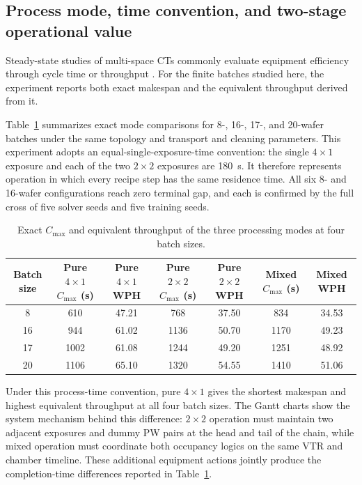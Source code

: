 \documentclass[final,5p,times,twocolumn]{elsarticle}
\begin{document}
\subsection{Process mode, time convention, and two-stage operational value}

Steady-state studies of multi-space CTs commonly evaluate equipment efficiency through cycle time or throughput \citep{gu2024multifinger}. For the finite batches studied here, the experiment reports both exact makespan and the equivalent throughput derived from it.

Table~\ref{tab:mode-extended-en} summarizes exact mode comparisons for 8-, 16-, 17-, and 20-wafer batches under the same topology and transport and cleaning parameters. This experiment adopts an equal-single-exposure-time convention: the single $4\times1$ exposure and each of the two $2\times2$ exposures are 180~s. It therefore represents operation in which every recipe step has the same residence time. All six 8- and 16-wafer configurations reach zero terminal gap, and each is confirmed by the full cross of five solver seeds and five training seeds.


\begin{table}[!htbp]
\centering
\small
\caption{Exact $C_{\max}$ and equivalent throughput of the three processing modes at four batch sizes.}
\label{tab:mode-extended-en}
\begin{tabular}{c c c c c c c}
\toprule
Batch size & Pure $4\times1$ $C_{\max}$ (s) & Pure $4\times1$ WPH & Pure $2\times2$ $C_{\max}$ (s) & Pure $2\times2$ WPH & Mixed $C_{\max}$ (s) & Mixed WPH\\
\midrule
8  & 610  & 47.21 & 768  & 37.50 & 834  & 34.53\\
16 & 944  & 61.02 & 1136 & 50.70 & 1170 & 49.23\\
17 & 1002 & 61.08 & 1244 & 49.20 & 1251 & 48.92\\
20 & 1106 & 65.10 & 1320 & 54.55 & 1410 & 51.06\\
\bottomrule
\end{tabular}
\end{table}

Under this process-time convention, pure $4\times1$ gives the shortest makespan and highest equivalent throughput at all four batch sizes. The Gantt charts show the system mechanism behind this difference: $2\times2$ operation must maintain two adjacent exposures and dummy PW pairs at the head and tail of the chain, while mixed operation must coordinate both occupancy logics on the same VTR and chamber timeline. These additional equipment actions jointly produce the completion-time differences reported in Table~\ref{tab:mode-extended-en}.
\end{document}
